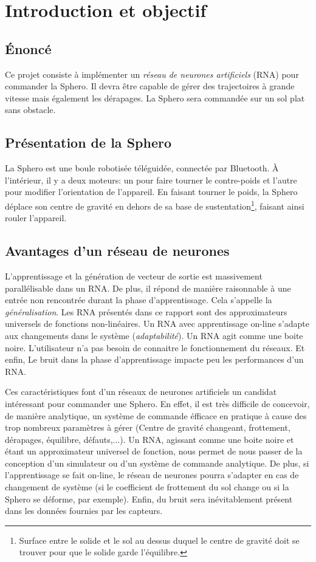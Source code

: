 \section{Introduction et objectif}
\subsection{Énoncé}
Ce projet consiste à implémenter un \emph{réseau de neurones artificiels} \hypertarget{rna}{(RNA)} pour commander la Sphero.
Il devra être capable de gérer des trajectoires à grande vitesse mais également les dérapages.
La Sphero sera commandée sur un sol plat sans obstacle.
\subsection{Présentation de la Sphero}
La Sphero est une boule robotisée téléguidée, connectée par Bluetooth.
À l'intérieur, il y a deux moteurs: un pour faire tourner le contre-poids et l'autre pour modifier l'orientation de l'appareil.
En faisant tourner le poids, la Sphero déplace son centre de gravité en dehors de sa base de sustentation\footnote{Surface entre le solide et le sol au dessus duquel le centre de gravité doit se trouver pour que le solide garde l'équilibre.}, faisant ainsi rouler l'appareil.
\subsection{Avantages d'un réseau de neurones}

L'apprentissage et la génération de vecteur de sortie est massivement parallélisable dans un RNA.\cite{corelet,Haykin}
De plus, il répond de manière raisonnable à une entrée non rencontrée durant la phase d'apprentissage. Cela s'appelle la \emph{généralisation}.\cite{statistica,Haykin}
Les RNA présentés dans ce rapport sont des approximateurs universels de fonctions non-linéaires.\cite{Haykin}
Un RNA avec apprentissage on-line s'adapte aux changements dans le système (\emph{adaptabilité}).\cite{Haykin}
Un RNA agit comme une boite noire. L'utilisateur n'a pas besoin de connaitre le fonctionnement du réseaux.
Et enfin, Le bruit dans la phase d'apprentissage impacte peu les performances d'un RNA.\cite{Haykin}

Ces caractéristiques font d'un réseaux de neurones artificiels un candidat intéressant pour commander une Sphero. 
En effet, il est très difficile de concevoir, de manière analytique, un système de commande éfficace en pratique à cause des trop nombreux paramètres à gérer (Centre de gravité changeant, frottement, dérapages, équilibre, défauts,...).
Un RNA, agissant comme une boite noire et étant un approximateur universel de fonction, nous permet de nous passer de la conception d'un simulateur ou d'un système de commande analytique.
De plus, si l'apprentissage se fait on-line, le réseau de neurones pourra s'adapter en cas de changement de système (si le coefficient de frottement du sol change ou si la Sphero se déforme, par exemple).
Enfin, du bruit sera inévitablement présent dans les données fournies par les capteurs.
